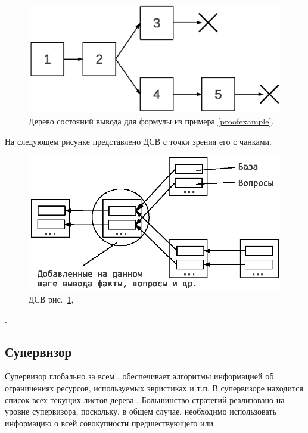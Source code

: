 \begin{figure}[h]
	\centering
	\includegraphics[width=0.4\linewidth]{pics/PST.eps}
	\caption{Дерево состояний вывода для формулы из примера \ref{proofexample}.}
	\label{fig:pst}
\end{figure}

На следующем рисунке представлено ДСВ с точки зрения его  с чанками.

\begin{figure}[h]
	\centering
	\includegraphics[width=0.6\linewidth]{pics/PST2.eps}
	\caption{ДСВ рис.~\ref{fig:pst}, }
	\label{fig:pst2}
\end{figure}

.


\subsection{Супервизор}
Супервизор  глобально за всем , обеспечивает алгоритмы информацией об ограничениях ресурсов, используемых эвристиках и т.п. В супервизоре находится список всех текущих листов дерева . Большинство стратегий реализовано на уровне супервизора, поскольку, в общем случае, необходимо использовать информацию о всей совокупности предшествующего или .

